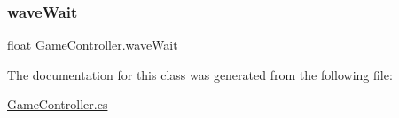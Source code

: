 \mbox{\label{class_game_controller_ad210270b367c1c439d35e8177d989019}} 
\subsubsection{\texorpdfstring{wave\+Wait}{waveWait}}
{\footnotesize\ttfamily float Game\+Controller.\+wave\+Wait}



The documentation for this class was generated from the following file\+:\begin{DoxyCompactItemize}
\item 
\mbox{\hyperlink{_game_controller_8cs}{Game\+Controller.\+cs}}\end{DoxyCompactItemize}
